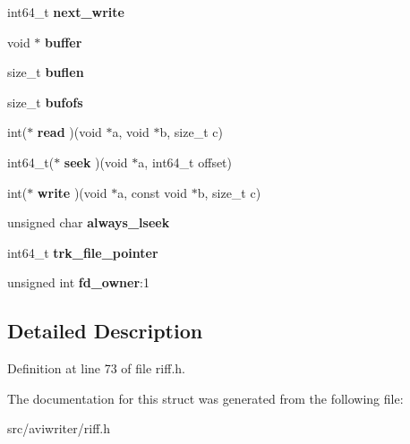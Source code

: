 \begin{DoxyCompactItemize}
\item 
\hypertarget{structriff__stack_aeb351e2d1abec8d76487a7b04178c481}{int64\-\_\-t {\bfseries next\-\_\-write}}\label{structriff__stack_aeb351e2d1abec8d76487a7b04178c481}

\item 
\hypertarget{structriff__stack_a3d76dbd435b2472ab2c427dff25657d5}{void $\ast$ {\bfseries buffer}}\label{structriff__stack_a3d76dbd435b2472ab2c427dff25657d5}

\item 
\hypertarget{structriff__stack_a5b545033ec9d27482e37d5f81aca9669}{size\-\_\-t {\bfseries buflen}}\label{structriff__stack_a5b545033ec9d27482e37d5f81aca9669}

\item 
\hypertarget{structriff__stack_aa9ed713c7d4248f6117652e2b5d586b4}{size\-\_\-t {\bfseries bufofs}}\label{structriff__stack_aa9ed713c7d4248f6117652e2b5d586b4}

\item 
\hypertarget{structriff__stack_ab417c7c63df02daf38b0a34ae975bd91}{int($\ast$ {\bfseries read} )(void $\ast$a, void $\ast$b, size\-\_\-t c)}\label{structriff__stack_ab417c7c63df02daf38b0a34ae975bd91}

\item 
\hypertarget{structriff__stack_ada0ab6f698c21aa7857496550ea3301a}{int64\-\_\-t($\ast$ {\bfseries seek} )(void $\ast$a, int64\-\_\-t offset)}\label{structriff__stack_ada0ab6f698c21aa7857496550ea3301a}

\item 
\hypertarget{structriff__stack_aecb3e7a418616fe49e0548e739ef3df2}{int($\ast$ {\bfseries write} )(void $\ast$a, const void $\ast$b, size\-\_\-t c)}\label{structriff__stack_aecb3e7a418616fe49e0548e739ef3df2}

\item 
\hypertarget{structriff__stack_a1ba565b046269521df39f654ccc5f9e1}{unsigned char {\bfseries always\-\_\-lseek}}\label{structriff__stack_a1ba565b046269521df39f654ccc5f9e1}

\item 
\hypertarget{structriff__stack_a26bcc6f531b66d77b9372426d22ec115}{int64\-\_\-t {\bfseries trk\-\_\-file\-\_\-pointer}}\label{structriff__stack_a26bcc6f531b66d77b9372426d22ec115}

\item 
\hypertarget{structriff__stack_a463025a03886a7f8b844c60025f33ec4}{unsigned int {\bfseries fd\-\_\-owner}\-:1}\label{structriff__stack_a463025a03886a7f8b844c60025f33ec4}

\end{DoxyCompactItemize}


\subsection{Detailed Description}


Definition at line 73 of file riff.\-h.



The documentation for this struct was generated from the following file\-:\begin{DoxyCompactItemize}
\item 
src/aviwriter/riff.\-h\end{DoxyCompactItemize}
